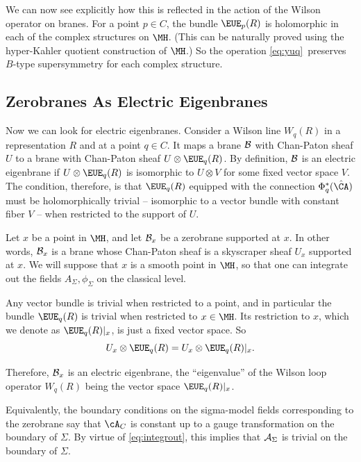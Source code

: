 We can now see explicitly how this is reflected in the action of
the Wilson operator on branes.  For a point $p\in C$, the bundle
${\EUE}_p(R)$ is holomorphic in each of the complex structures on
$\MH$.  (This can be naturally proved using the hyper-Kahler
quotient construction of $\MH$.) So the operation \eqref{eq:yuq}\ preserves
$B$-type supersymmetry for each complex structure.

\subsection{Zerobranes As Electric Eigenbranes}

\label{sec:zerobelectric}

Now we can look for electric eigenbranes.  Consider a Wilson line
$W_q(R)$ in a representation $R$ and at a point $q\in C$.  It maps
a brane ${\cal B}$ with Chan-Paton sheaf $U$ to a brane with
Chan-Paton sheaf $U\otimes {\EUE}_q(R)$.  By definition, ${\cal
B}$ is an electric eigenbrane if $U\otimes {\EUE}_q(R)$ is
isomorphic to $U\otimes V$ for some fixed vector space $V$. The
condition, therefore, is that ${\EUE}_q(R)$ equipped with the
connection $\Phi_q^*(\hat \CA)$ must be holomorphically trivial --
isomorphic to a vector bundle with constant fiber $V$ -- when
restricted to the support of $U$.

Let $x$ be a point in $\MH$, and let ${\cal B}_x$ be a zerobrane
supported at $x$. In other words, ${\cal B}_x$ is a brane whose
Chan-Paton sheaf is a skyscraper sheaf $U_x$ supported at $x$. We
will suppose that $x$ is a smooth point in $\MH$, so that one can
integrate out the fields $A_\Sigma,\phi_\Sigma$ on the classical
level.

Any vector bundle is trivial when restricted to a point, and in
particular the bundle ${\EUE}_q(R)$ is trivial when restricted to
$x\in \MH$.  Its restriction to $x$, which we denote as
${\EUE}_q(R)|_x$, is just a fixed vector space.  So
\setcounter{equation}{9}
\begin{equation}\label{eq:insto}
U_x\otimes {\EUE}_q(R)=U_x\otimes {\EUE}_q(R)|_x.
\end{equation}

Therefore, ${\cal B}_x$ is an electric eigenbrane, the
``eigenvalue'' of the Wilson loop operator $W_q(R)$ being the
vector space ${\EUE}_q(R)|_x$.

Equivalently, the boundary conditions on the sigma-model fields
corresponding to the zerobrane say that $\cA_C$ is constant up to
a gauge transformation on the boundary of $\Sigma$. By virtue of
\eqref{eq:integrout}, this implies that ${\cal A}_\Sigma$ is trivial on the
boundary of $\Sigma$.

